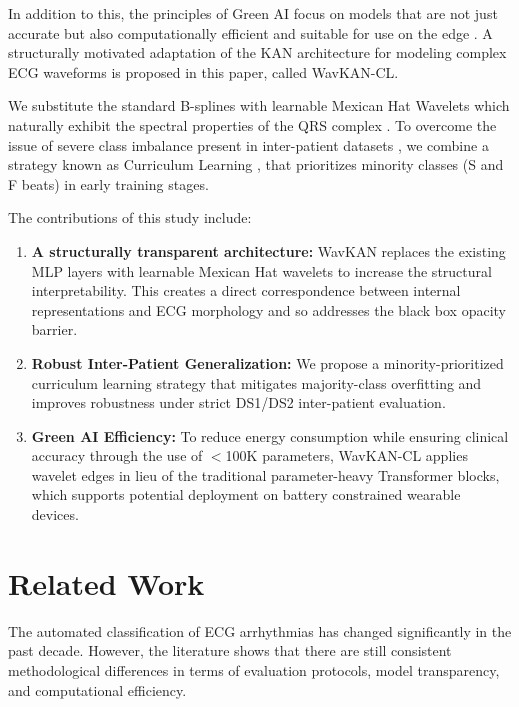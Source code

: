 \documentclass[pdflatex,sn-mathphys-num]{sn-jnl}
\theoremstyle{thmstyleone}
\theoremstyle{thmstyletwo}
\theoremstyle{thmstylethree}
\begin{document}
In addition to this, the principles of Green AI focus on models that are not just accurate but also computationally efficient and suitable for use on the edge \cite{farag_tiny_2023}. A structurally motivated adaptation of the KAN architecture for modeling complex ECG waveforms is proposed in this paper, called WavKAN-CL.

We substitute the standard B-splines with learnable Mexican Hat Wavelets which naturally exhibit the spectral properties of the QRS complex \cite{addison_wavelet_2005}. To overcome the issue of severe class imbalance present in inter-patient datasets \cite{xiao_deep_2023, bae_handling_2025}, we combine a strategy known as Curriculum Learning \cite{schmale_curriculum_2025}, that prioritizes minority classes (S and F beats) in early training stages.

The contributions of this study include:
\begin{enumerate}
    \item \textbf{A structurally transparent architecture:} WavKAN replaces the existing MLP layers with learnable Mexican Hat wavelets to increase the structural interpretability. This creates a direct correspondence between internal representations and ECG morphology and so addresses the black box opacity barrier.
    \item \textbf{Robust Inter-Patient Generalization:} We propose a minority-prioritized curriculum learning strategy that mitigates majority-class overfitting and improves robustness under strict DS1/DS2 inter-patient evaluation.
    \item \textbf{Green AI Efficiency:} To reduce energy consumption while ensuring clinical accuracy through the use of $<$100K parameters, WavKAN-CL applies wavelet edges in lieu of the traditional parameter-heavy Transformer blocks, which supports potential deployment on battery constrained wearable devices.
\end{enumerate}

\section{Related Work}
\label{sec:related_work}

The automated classification of ECG arrhythmias has changed significantly in the past decade. However, the literature shows that there are still consistent methodological differences in terms of evaluation protocols, model transparency, and computational efficiency.
\end{document}
